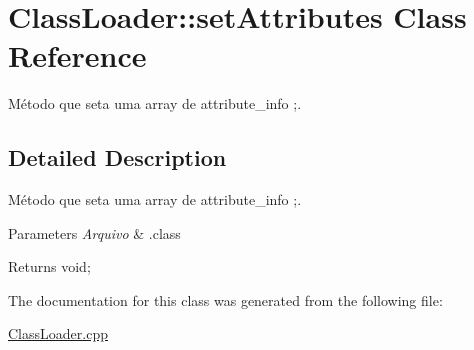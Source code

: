 \hypertarget{class_class_loader_1_1set_attributes}{}\section{Class\+Loader\+:\+:set\+Attributes Class Reference}
\label{class_class_loader_1_1set_attributes}


Método que seta uma array de attribute\+\_\+info ;.  




\subsection{Detailed Description}
Método que seta uma array de attribute\+\_\+info ;. 


\begin{DoxyParams}{Parameters}
{\em Arquivo} & .class \\
\hline
\end{DoxyParams}
\begin{DoxyReturn}{Returns}
void; 
\end{DoxyReturn}


The documentation for this class was generated from the following file\+:\begin{DoxyCompactItemize}
\item 
\hyperlink{_class_loader_8cpp}{Class\+Loader.\+cpp}\end{DoxyCompactItemize}
